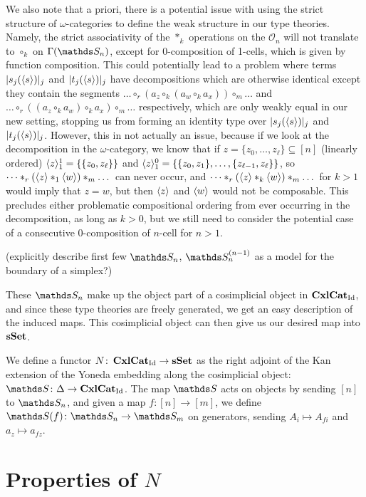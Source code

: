 \documentclass{article}
\begin{document}
We also note that a priori, there is a potential issue with using the strict structure of $\omega$-categories to define the weak structure in our type theories. Namely, the strict associativity of the $*_k$ operations on the $\mathcal{O}_n$ will not translate to $\circ_k$ on $\Gamma(\bS_n)$, except for 0-composition of 1-cells, which is given by function composition. This could potentially lead to a problem where terms $|s_j(\langle s\rangle)|_j$ and $|t_j(\langle s\rangle)|_j$ have decompositions which are otherwise identical except they contain the segments $\dots\circ_r(a_z\circ_k(a_w\circ_ka_x))\circ_m\dots$ and $\dots\circ_r((a_z\circ_ka_w)\circ_ka_x)\circ_m\dots$ respectively, which are only weakly equal in our new setting, stopping us from forming an identity type over $|s_j(\langle s\rangle)|_j$ and $|t_j(\langle s\rangle)|_j$. However, this in not actually an issue, because if we look at the decomposition in the $\omega$-category, we know that if $z=\{z_0,\dots,z_\ell\}\subseteq[n]$ (linearly ordered) $\langle z\rangle_1^1=\{\{z_0,z_\ell\}\}$ and $\langle z\rangle_1^0=\{\{z_0,z_1\},\dots,\{z_{\ell-1},z_\ell\}\}$, so $\dots*_r(\langle z\rangle*_1\langle w\rangle)*_m\dots$ can never occur, and $\dots*_r(\langle z\rangle*_k\langle w\rangle)*_m\dots$ for $k>1$ would imply that $z=w$, but then $\langle z\rangle$ and $\langle w\rangle$ would not be composable. This precludes either problematic compositional ordering from ever occurring in the decomposition, as long as $k>0$, but we still need to consider the potential case of a consecutive 0-composition of $n$-cell for $n>1$. 

(explicitly describe first few $\bS_n$, $\bS_n^{(n-1)}$ as a model for the boundary of a simplex?)

These $\bS_n$ make up the object part of a cosimplicial object in $\operatorname{\mathbf{CxlCat}}_{\operatorname{Id}}$, and since these type theories are freely generated, we get an easy description of the induced maps. This cosimplicial object can then give us our desired map into $\operatorname{\mathbf{sSet}}$.

\begin{defn}
    We define a functor $N\colon\operatorname{\mathbf{CxlCat}}_{\operatorname{Id}}\to\operatorname{\mathbf{sSet}}$ as the right adjoint of the Kan extension of the Yoneda embedding along the cosimplicial object: $\bS\colon\Delta\to\CxlCat_{\Id}$. The map $\bS$ acts on objects by sending $[n]$ to $\bS_n$, and given a map $f\colon[n]\to[m]$, we define $\bS(f)\colon\bS_n\to\bS_m$ on generators, sending $A_i\mapsto A_{fi}$ and $a_z\mapsto a_{fz}$.
\end{defn}

\section{Properties of \texorpdfstring{$N$}{N}}
\end{document}
